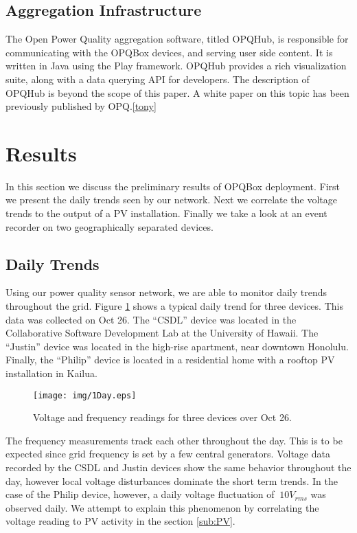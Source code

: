 \subsection{Aggregation Infrastructure}
The Open Power Quality aggregation software, titled OPQHub, is responsible for communicating with the OPQBox devices, and serving user side content. It is written in Java using the Play framework. OPQHub provides a rich visualization suite, along with a data querying API for developers. The description of OPQHub is beyond the scope of this paper. A white paper on this topic has been previously published by OPQ.\ref{tony}

\section{Results}

In this section we discuss the preliminary results of  OPQBox deployment. First we present the daily trends seen by our network. Next we correlate the voltage trends to the output
of a PV installation. Finally we take a look at an event recorder on two geographically separated devices.

\subsection{Daily Trends}

Using our power quality sensor network, we are able to monitor daily trends throughout the grid. Figure \ref{fig:trends} shows a typical daily trend for three devices. This data was 
collected on Oct 26. The ``CSDL'' device was located in the Collaborative Software Development Lab at the University of Hawaii. The ``Justin'' device was located in the high-rise apartment, near
downtown Honolulu. Finally, the ``Philip'' device is located in a residential home with a rooftop PV installation in Kailua.

\newpage
\begin{figure}[h!]
\centering
\texttt{[image: img/1Day.eps]}
\caption{Voltage and frequency readings for three devices over Oct 26.}
\label{fig:trends}
\end{figure}
\newpage

The frequency measurements track each other throughout the day. This is to be expected since grid frequency is set by a few central generators. Voltage data recorded by the CSDL and  Justin devices show the same behavior throughout the day, however local voltage disturbances dominate the short term trends. In the case of the Philip device, however, a daily voltage fluctuation of $~10V_{rms}$ was observed daily. We attempt to explain this phenomenon by correlating the voltage reading to PV activity in the section \ref{sub:PV}.

